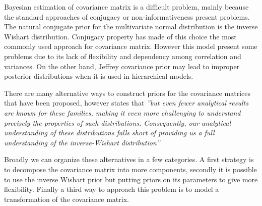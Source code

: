 \documentclass{article}
\begin{document}
Bayesian estimation of covariance matrix is a difficult problem, mainly because the standard approaches of conjugacy or non-informativeness present problems.  The natural conjugate prior for the multivariate normal distribution is the inverse Wishart distribution. Conjugacy property has made of this choice the most commonly used approach for covariance matrix. However this model present some problems due to its lack of flexibility and dependency among correlation and variances.  On the other hand, Jeffrey covariance prior may lead to improper posterior distributions when it is used in hierarchical models. 

There are many alternative ways to construct priors for the covariance matrices that have been proposed,  however \cite{visualize} states that 
 \textit{''but even fewer analytical results are known for these families, making it even more challenging to understand precisely the properties of such distributions. Consequently, our analytical understanding of these distributions falls short of providing us a full understanding of the inverse-Wishart distribution'' }

Broadly we can organize these alternatives in a few categories. A first strategy is to decompose the covariance matrix into more components, secondly it is possible to use the inverse Wishart prior but putting priors on its parameters to give more flexibility. Finally a third way to approach this problem is to model a transformation of the covariance matrix. 
 
\end{document}
